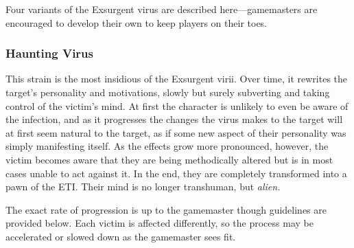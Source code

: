 Four variants of the Exsurgent virus are described here—gamemasters are encouraged to develop their own to keep players on their toes. 

\subsubsection{Haunting Virus} 

This strain is the most insidious of the Exsurgent virii. Over time, it rewrites the target's personality and motivations, slowly but surely subverting and taking control of the victim's mind. At first the character is unlikely to even be aware of the infection, and as it progresses the changes the virus makes to the target will at first seem natural to the target, as if some new aspect of their personality was simply manifesting itself. As the effects grow more pronounced, however, the victim becomes aware that they are being methodically altered but is in most cases unable to act against it. In the end, they are completely transformed into a pawn of the ETI. Their mind is no longer transhuman, but \textit{alien.} 

The exact rate of progression is up to the gamemaster though guidelines are provided below. Each victim is affected differently, so the process may be accelerated or slowed down as the gamemaster sees fit. 



